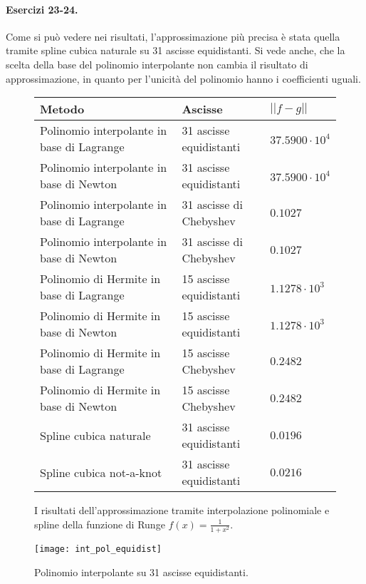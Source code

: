 \paragraph{Esercizi 23-24.} Come si può vedere nei risultati, l'approssimazione più precisa è stata quella tramite spline cubica naturale su 31 ascisse equidistanti. Si vede anche, che la scelta della base del polinomio interpolante non cambia il risultato di approssimazione, in quanto per l'unicità del polinomio hanno i coefficienti uguali.

\begin{figure}
  \centering
  \begin{tabular}{|p{0.5\linewidth}|p{0.3\linewidth}|p{0.2\linewidth}|}
    \hline
    Metodo & Ascisse & $||f - g||$ \\
    \hline\hline
    
    Polinomio interpolante in base di Lagrange & 31 ascisse equidistanti & $37.5900 \cdot 10^4$ \\
    \hline
    Polinomio interpolante in base di Newton & 31 ascisse equidistanti & $37.5900 \cdot 10^4$ \\
    \hline
    Polinomio interpolante in base di Lagrange & 31 ascisse di Chebyshev & $0.1027$ \\
    \hline
    Polinomio interpolante in base di Newton & 31 ascisse di Chebyshev & $0.1027$ \\
    \hline
    Polinomio di Hermite in base di Lagrange & 15 ascisse equidistanti & $1.1278 \cdot 10^3$ \\
    \hline
    Polinomio di Hermite in base di Newton & 15 ascisse equidistanti & $1.1278 \cdot 10^3$ \\
    \hline
    Polinomio di Hermite in base di Lagrange & 15 ascisse Chebyshev & $0.2482$ \\
    \hline
    Polinomio di Hermite in base di Newton & 15 ascisse Chebyshev & $0.2482$ \\
    \hline
    Spline cubica naturale & 31 ascisse equidistanti & $0.0196$ \\
    \hline
    Spline cubica not-a-knot & 31 ascisse equidistanti & $0.0216$ \\
    \hline
  \end{tabular}
  \caption{I risultati dell'approssimazione tramite interpolazione polinomiale e spline della funzione di Runge $f(x) = \frac{1}{1 + x^2}$.}
\end{figure}

\begin{figure}
  \centering
  \texttt{[image: int\_pol\_equidist]}
  \caption{Polinomio interpolante su 31 ascisse equidistanti.}
\end{figure}

